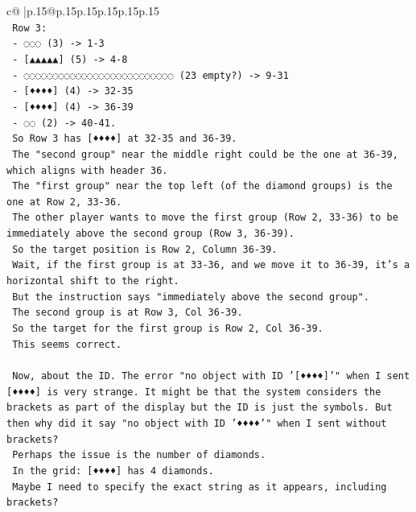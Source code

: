 \documentclass{article}
\begin{document}
{\begin{supertabular}{c@{$\;$}|p{.15\linewidth}@{}p{.15\linewidth}p{.15\linewidth}p{.15\linewidth}p{.15\linewidth}p{.15\linewidth}}
{{{\\ 
\texttt{    Row 3:} \\
\texttt{    {-} ◌◌◌ (3) {-}> 1{-}3} \\
\texttt{    {-} {[}▲▲▲▲▲{]} (5) {-}> 4{-}8} \\
\texttt{    {-} ◌◌◌◌◌◌◌◌◌◌◌◌◌◌◌◌◌◌◌◌◌◌◌◌◌◌ (23 empty?) {-}> 9{-}31} \\
\texttt{    {-} {[}♦♦♦♦{]} (4) {-}> 32{-}35} \\
\texttt{    {-} {[}♦♦♦♦{]} (4) {-}> 36{-}39} \\
\texttt{    {-} ◌◌ (2) {-}> 40{-}41.} \\
\texttt{    So Row 3 has {[}♦♦♦♦{]} at 32{-}35 and 36{-}39.} \\
\texttt{    The "second group" near the middle right could be the one at 36{-}39, which aligns with header 36.} \\
\texttt{    The "first group" near the top left (of the diamond groups) is the one at Row 2, 33{-}36.} \\
\texttt{    The other player wants to move the first group (Row 2, 33{-}36) to be immediately above the second group (Row 3, 36{-}39).} \\
\texttt{    So the target position is Row 2, Column 36{-}39.} \\
\texttt{    Wait, if the first group is at 33{-}36, and we move it to 36{-}39, it's a horizontal shift to the right.} \\
\texttt{    But the instruction says "immediately above the second group".} \\
\texttt{    The second group is at Row 3, Col 36{-}39.} \\
\texttt{    So the target for the first group is Row 2, Col 36{-}39.} \\
\texttt{    This seems correct.} \\
\\ 
\texttt{    Now, about the ID. The error "no object with ID '{[}♦♦♦♦{]}'" when I sent {[}♦♦♦♦{]} is very strange. It might be that the system considers the brackets as part of the display but the ID is just the symbols. But then why did it say "no object with ID '♦♦♦♦'" when I sent without brackets?} \\
\texttt{    Perhaps the issue is the number of diamonds.} \\
\texttt{    In the grid: {[}♦♦♦♦{]} has 4 diamonds.} \\
\texttt{    Maybe I need to specify the exact string as it appears, including brackets?} \\
}}}
\end{supertabular}}
\end{document}
